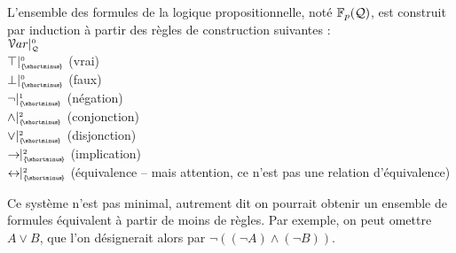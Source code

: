 			\begin{Definition}
				L'ensemble des formules de la logique propositionnelle, noté \(\mathbb{F}_p (\mathcal{Q})\), est construit par induction à partir des règles de construction suivantes : \\
					 \bdot \(\EuScript{V}ar |_{\scriptscriptstyle \mathcal{Q}}^{\scriptscriptstyle 0}\) \\
					 \bdot \(\top |_{\scriptscriptstyle \{\! \shortminus \!\}}^{\scriptscriptstyle 0}\) (vrai) \\
					 \bdot \(\bot |_{\scriptscriptstyle \{\! \shortminus \!\}}^{\scriptscriptstyle 0}\) (faux) \\
					 \bdot \(\neg \constr{1}{\noset}\) (négation) \\
					 \bdot \(\wedge \constr{2}{\noset}\) (conjonction) \\
					 \bdot \(\vee \constr{2}{\noset}\) (disjonction) \\
					 \bdot \(\rightarrow \!\! \constr{2}{\noset}\) (implication) \\
					 \bdot \(\leftrightarrow \!\! \constr{2}{\noset}\) (équivalence -- mais attention, ce n'est pas une relation d'équivalence)
			\end{Definition}
			\vspace{2mm}
			\begin{Remarque}
				Ce système n'est pas minimal, autrement dit on pourrait obtenir un ensemble de formules équivalent à partir de moins de règles. Par exemple, on peut omettre \(A \vee B\), que l'on désignerait alors par \(\neg \left((\neg A) \wedge (\neg B)\right)\).
			\end{Remarque}
			
		
